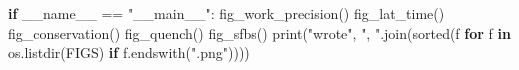 \documentclass[
  10pt,
]{article}
\newenvironment{Shaded}{}{}
\newcommand{\BuiltInTok}[1]{\textcolor[rgb]{0.00,0.50,0.00}{#1}}
\newcommand{\ControlFlowTok}[1]{\textcolor[rgb]{0.00,0.44,0.13}{\textbf{#1}}}
\newcommand{\KeywordTok}[1]{\textcolor[rgb]{0.00,0.44,0.13}{\textbf{#1}}}
\newcommand{\NormalTok}[1]{#1}
\newcommand{\OperatorTok}[1]{\textcolor[rgb]{0.40,0.40,0.40}{#1}}
\newcommand{\StringTok}[1]{\textcolor[rgb]{0.25,0.44,0.63}{#1}}
\newcommand{\VariableTok}[1]{\textcolor[rgb]{0.10,0.09,0.49}{#1}}
\begin{document}
\begin{Shaded}
\begin{Highlighting}[]
\ControlFlowTok{if} \VariableTok{\_\_name\_\_} \OperatorTok{==} \StringTok{"\_\_main\_\_"}\NormalTok{:}
\NormalTok{    fig\_work\_precision()}
\NormalTok{    fig\_lat\_time()}
\NormalTok{    fig\_conservation()}
\NormalTok{    fig\_quench()}
\NormalTok{    fig\_sfbs()}
    \BuiltInTok{print}\NormalTok{(}\StringTok{"wrote"}\NormalTok{, }\StringTok{", "}\NormalTok{.join(}\BuiltInTok{sorted}\NormalTok{(f }\ControlFlowTok{for}\NormalTok{ f }\KeywordTok{in}\NormalTok{ os.listdir(FIGS) }\ControlFlowTok{if}\NormalTok{ f.endswith(}\StringTok{".png"}\NormalTok{))))}
\end{Highlighting}
\end{Shaded}
\end{document}
